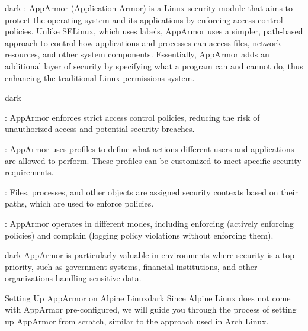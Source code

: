 \label{AppArmor}
\begin{baseBoxThree}{}{dark}
    \bigskip
    : AppArmor (Application Armor) is a Linux security module that aims to protect the operating system and its applications by enforcing access control policies.
    Unlike SELinux, which uses labels, AppArmor uses a simpler, path-based approach to control how applications and processes can access files, network resources, and other system components.
    Essentially, AppArmor adds an additional layer of security by specifying what a program can and cannot do, thus enhancing the traditional Linux permissions system.
    \bigskip
    \begin{baseBoxThree}{}{dark}
        \begin{posnexItemize}
            \item[\sA] : AppArmor enforces strict access control policies, reducing the risk of unauthorized access and potential security breaches.
            \item[\sA] : AppArmor uses profiles to define what actions different users and applications are allowed to perform. These profiles can be customized to meet specific security requirements.
            \item[\sA] : Files, processes, and other objects are assigned security contexts based on their paths, which are used to enforce policies.
            \item[\sA] : AppArmor operates in different modes, including enforcing (actively enforcing policies) and complain (logging policy violations without enforcing them).
        \end{posnexItemize}
        \smallskip
        \begin{baseBoxThree}{}{dark}
            \smallskip
            AppArmor is particularly valuable in environments where security is a top priority, such as government systems, financial institutions, and other organizations handling sensitive data.
            \smallskip
        \end{baseBoxThree}
        \smallskip
    \end{baseBoxThree}
    \smallskip
    \begin{baseBoxThree}{Setting Up AppArmor on Alpine Linux}{dark}
        \smallskip
        Since Alpine Linux does not come with AppArmor pre-configured, we will guide you through the process of setting up AppArmor from scratch, similar to the approach used in Arch Linux.
        \smallskip
    \end{baseBoxThree}
    \smallskip
\end{baseBoxThree}

